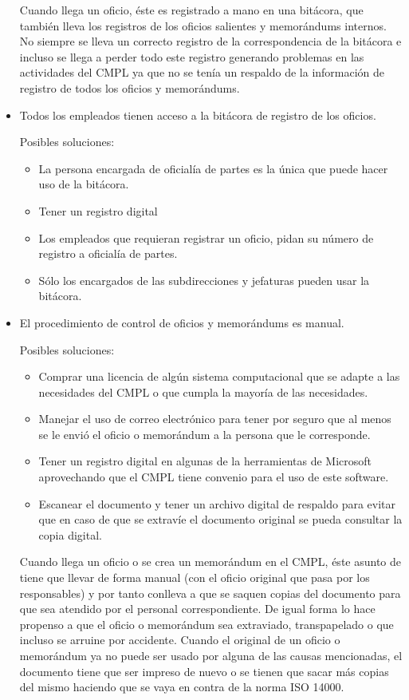 \begin{itemize}
Cuando llega un oficio, éste es registrado a mano en una bitácora, que también lleva los registros de los oficios salientes y memorándums internos. No siempre se lleva un correcto registro de la correspondencia de la bitácora e incluso se llega a perder todo este registro generando problemas en las actividades del CMPL ya que no se tenía un respaldo de la información de registro de todos los oficios y memorándums.

	\item Todos los empleados tienen acceso a la bitácora de registro de los oficios.
	
	Posibles soluciones:
	\begin{itemize}
		\item La persona encargada de oficialía de partes es la única que puede hacer uso de la bitácora.
		\item Tener un registro digital 
		\item Los empleados que requieran registrar un oficio, pidan su número de registro a oficialía de partes.
		\item Sólo los encargados de las subdirecciones y jefaturas pueden usar la bitácora.
	\end{itemize}
	
	\item El procedimiento de control de oficios y memorándums es manual.
	
	Posibles soluciones:
	\begin{itemize}
		\item Comprar una licencia de algún sistema computacional que se adapte a las necesidades del CMPL o que cumpla la mayoría de las necesidades.
		\item Manejar el uso de correo electrónico para tener por seguro que al menos se le envió el oficio o memorándum a la persona que le corresponde.
		\item Tener un registro digital en algunas de la herramientas de Microsoft aprovechando que el CMPL tiene convenio para el uso de este software.
		\item Escanear el documento y tener un archivo digital de respaldo para evitar que en caso de que se extravíe el documento original se pueda consultar la copia digital.
	\end{itemize}	
	
Cuando llega un oficio o se crea un memorándum en el CMPL, éste asunto de tiene que llevar de forma manual (con el oficio original que pasa por los responsables) y por tanto conlleva a que se saquen copias del documento para que sea atendido por el personal correspondiente. De igual forma lo hace propenso a que el oficio o memorándum sea extraviado, transpapelado o que incluso se arruine por accidente. Cuando el original de un oficio o memorándum ya no puede ser usado por alguna de las causas mencionadas, el documento tiene que ser impreso de nuevo o se tienen que sacar más copias del mismo haciendo que se vaya en contra de la norma ISO 14000.


\end{itemize}
